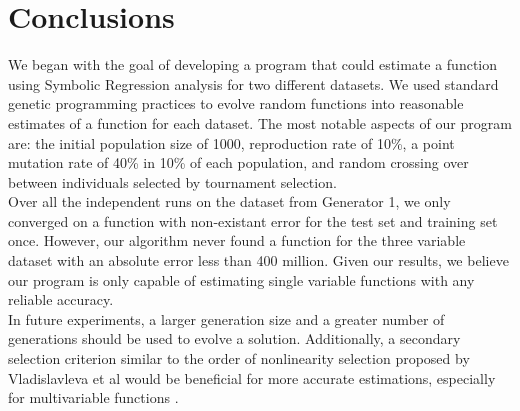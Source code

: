 \section{Conclusions}
\label{sec:concl}

We began with the goal of developing a program that could estimate a
function using Symbolic Regression analysis for two different
datasets. We used standard genetic programming practices to evolve
random functions into reasonable estimates of a function for each
dataset. The most notable aspects of our program are: the initial
population size of 1000, reproduction rate of 10\%, a point
mutation rate of 40\% in 10\% of each population, and random crossing
over between individuals selected by tournament selection.\\

Over all the independent runs on the dataset from Generator 1, we only
converged on a function with non-existant error for the test set and
training set once. However, our algorithm never found a function for
the three variable dataset with an absolute error less than 400
million. Given our results, we
believe our program is only capable of estimating single variable
functions with any reliable accuracy. \\

In future experiments, a larger generation size and a greater number of generations should be used to evolve a solution. Additionally, a secondary selection criterion similar to the order of nonlinearity selection proposed by Vladislavleva et al would be beneficial for more accurate estimations, especially for multivariable functions \cite{Vladislavleva:2009:ONC:1650356.1650365}.